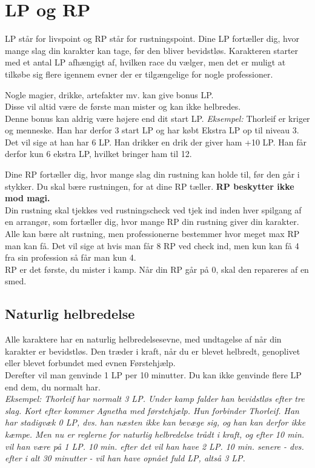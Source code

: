 \section{LP og RP}
LP står for livspoint og RP står for rustningspoint. Dine LP fortæller dig, hvor mange slag din karakter kan tage, før den bliver bevidstløs. Karakteren starter med et antal LP afhængigt af, hvilken race du vælger, men det er muligt at tilkøbe sig flere igennem evner der er tilgængelige for nogle professioner.\\
\begin{tcolorbox}[colback=red!10!white, colframe=red!80!black, title=Important Note]
Nogle magier, drikke, artefakter mv. kan give bonus LP.\\
Disse vil altid være de første man mister og kan ikke helbredes.\\
Denne bonus kan aldrig være højere end dit start LP. 
\textit{Eksempel:} Thorleif er kriger og menneske. Han har derfor 3 start LP og har købt Ekstra LP op til niveau 3. Det vil sige at han har 6 LP. Han drikker en drik der giver ham +10 LP. Han får derfor kun 6 ekstra LP, hvilket bringer ham til 12.
\end{tcolorbox}
Dine RP fortæller dig, hvor mange slag din rustning kan holde til, før den går i stykker. Du skal bære rustningen, for at dine RP tæller. \textbf{RP beskytter ikke mod magi.}\\
Din rustning skal tjekkes ved rustningscheck ved tjek ind inden hver spilgang af en arrangør, som fortæller dig, hvor mange RP din rustning giver din karakter. Alle kan bære alt rustning, men professionerne bestemmer hvor meget max RP man kan få. Det vil sige at hvis man får 8 RP ved check ind, men kun kan få 4 fra sin profession så får man kun 4.\\  
RP er det første, du mister i kamp. Når din RP går på 0, skal den repareres af en smed.

\subsection{Naturlig helbredelse}
Alle karaktere har en naturlig helbredelsesevne, med undtagelse af når din karakter er bevidstløs. Den træder i kraft, når du er blevet helbredt, genoplivet eller blevet forbundet med evnen Førstehjælp.\\
Derefter vil man genvinde 1 LP per 10 minutter. Du kan ikke genvinde flere LP end dem, du normalt har.\\
\textit{Eksempel: Thorleif har normalt 3 LP. Under kamp falder han bevidstløs efter tre slag. Kort efter kommer Agnetha med førstehjælp. Hun forbinder Thorleif. Han har stadigvæk 0 LP, dvs. han næsten ikke kan bevæge sig, og han kan derfor ikke kæmpe. Men nu er reglerne for naturlig helbredelse trådt i kraft, og efter 10 min. vil han være på 1 LP. 10 min. efter det vil han have 2 LP. 10 min. senere - dvs. efter i alt 30 minutter - vil han have opnået fuld LP, altså 3 LP.}

